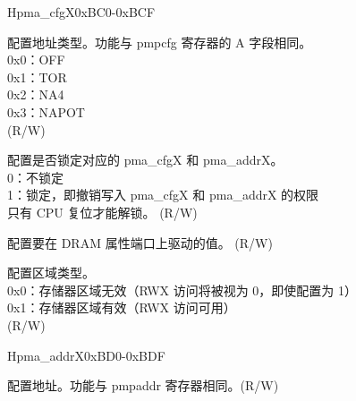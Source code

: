 
\begin{register}{H}{pma\_cfgX}{0xBC0-0xBCF}
\label{regdesc:pma_cfgX}
%
%
%
%
%
%
%
%
\regnewline%
\begin{regdesc}
\begin{reglist}
\label{fielddesc:A}\item [A] 配置地址类型。功能与 pmpcfg 寄存器的 A 字段相同。\\
0x0：OFF\\
0x1：TOR\\
0x2：NA4\\
0x3：NAPOT\\
(R/W)
\label{fielddesc:Lock}\item [Lock] 配置是否锁定对应的 pma\_cfgX 和 pma\_addrX。\\
0：不锁定\\
1：锁定，即撤销写入 pma\_cfgX 和 pma\_addrX 的权限\\
只有 CPU 复位才能解锁。 (R/W)
\label{fielddesc:Attribute}\item [Attribute] 配置要在 DRAM 属性端口上驱动的值。 (R/W)
\label{fielddesc:Type}\item [Type] 配置区域类型。\\
0x0：存储器区域无效（RWX 访问将被视为 0，即使配置为 1）\\
0x1：存储器区域有效（RWX 访问可用）\\
(R/W)
\end{reglist}
\end{regdesc}
\end{register}

\begin{register}{H}{pma\_addrX}{0xBD0-0xBDF}
\label{regdesc:pma_addrX}
%
\regnewline%
\begin{regdesc}
\begin{reglist}
\label{fielddesc:Addr}\item [Addr] 配置地址。功能与 pmpaddr 寄存器相同。(R/W)
\end{reglist}
\end{regdesc}
\end{register}